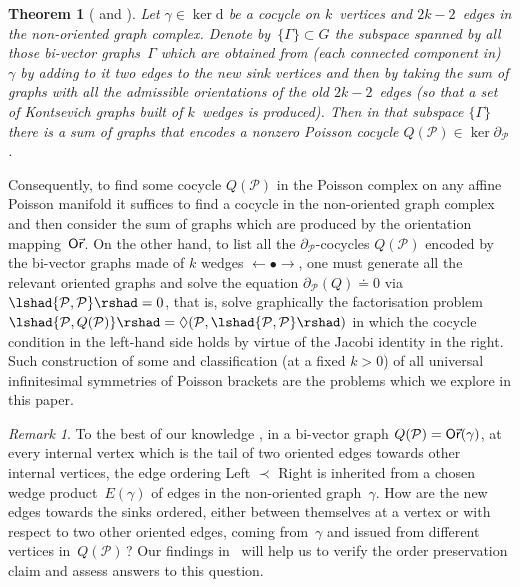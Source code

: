 \documentclass[a4paper]{jpconf}%
\newtheorem{theor}{Theorem}%
\theoremstyle{definition}
\theoremstyle{remark}
\newtheorem{rem}{Remark}%
\newcommand{\cP}{\mathcal{P}}\newcommand{\cR}{\mathcal{R}}
\newcommand{\Id}{{\mathrm d}}
\newcommand{\schouten}[1]{\lshad {#1} \rshad}
\def\oldvec{\mathaccent "017E\relax } %
\DeclareMathOperator{\Ori}{\mathsf{O\oldvec{r}}}
\begin{document}
\begin{theor}[{{\cite{Ascona96} and \cite[App.\:K]{WillwacherGRT}}}]%
\label{ThOrient}
Let $\gamma \in \ker \Id$ be a cocycle on $k$~vertices and $2k-2$~edges in the non-oriented graph complex. Denote by~$\{\Gamma\} \subset G$ the subspace spanned by all those bi\/-\/vector graphs~$\Gamma$ which are obtained from \textup{(}each connected component in\textup{)} $\gamma$ by adding to it two edges to the new sink vertices and then by taking the sum of graphs with all the admissible orientations of the old $2k-2$~edges
\textup{(}so that a set of Kontsevich graphs built of %
$k$~wedges is produced\textup{)}.
Then in that subspace $\{\Gamma\}$ there is a sum of graphs that encodes a nonzero Poisson cocycle $Q(\cP) \in \ker \partial_\cP$.
\end{theor}


Consequently, to find some cocycle $Q(\cP) %
$ in the Poisson complex on any affine Poisson manifold it suffices to find a cocycle in the non-oriented graph complex and then consider %
the sum of graphs which are produced by the orientation mapping~$\Ori$. 
On the other hand, to list all the $\partial_\cP$-cocycles $Q(\cP)$ encoded by the bi-vector graphs made of %
$k$ wedges ${\leftarrow}{ \bullet }{\rightarrow}$, one must generate all the relevant oriented graphs and solve the equation $\partial_\cP(Q) \doteq 0$ via $\schouten{\cP,\cP} = 0$, that is, solve graphically the factorisation problem $\schouten{\cP, Q(\cP)} = \Diamond(\cP, \schouten{\cP,\cP})$ in which the cocycle condition in the left-hand side holds by virtue of the Jacobi identity in the right.
Such construction of some and classification (at a fixed $k > 0$) of all universal infinitesimal symmetries of Poisson %
brackets are the problems which we explore in this paper.

\begin{rem}\label{RemSigns}
To the best of our knowledge \cite{Kontsevich2017private}, in a bi-vector graph $Q(\cP) = \Ori(\gamma)$, at every internal vertex which is the tail of two oriented edges towards other internal vertices, the edge ordering Left $\prec$ Right %
is inherited from a chosen wedge product~$E(\gamma)$ of edges in the non-oriented 
graph~$\gamma$.
How are the new edges towards the sinks ordered, either between themselves at a vertex or with respect to two other oriented edges, coming from~$\gamma$ and issued from different vertices in~$Q(\cP)$\,?
Our findings in~\cite{WeFactorize5Wheel} will help us to verify the order preservation claim and assess answers to this question.
\end{rem}
\end{document}
